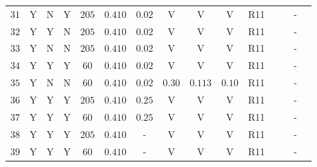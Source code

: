 \begin{center}
\begin{longtable}{@{\extracolsep{\fill}}ccccccccccccccc@{}}
\rule[-1ex]{0pt}{2.5ex} $31$ & Y & N & Y & $205$ & $0.410$ & $0.02$ & V & V & V & R11 & \cite{Humphreys:2013eja} & \cite{Pietrzynski:2013gia} & - & \cite{vanLeeuwen:2007xw} \\
\rule[-1ex]{0pt}{2.5ex} $32$ & Y & Y & N & $205$ & $0.410$ & $0.02$ & V & V & V & R11 & \cite{Humphreys:2013eja} & \cite{Pietrzynski:2013gia} & - & \cite{vanLeeuwen:2007xw} \\
\rule[-1ex]{0pt}{2.5ex} $33$ & Y & N & N & $205$ & $0.410$ & $0.02$ & V & V & V & R11 & \cite{Humphreys:2013eja} & \cite{Pietrzynski:2013gia} & - & \cite{vanLeeuwen:2007xw} \\
\rule[-1ex]{0pt}{2.5ex} $34$ & Y & Y & Y & $60$ & $0.410$ & $0.02$ & V & V & V & R11 & \cite{Humphreys:2013eja} & \cite{Pietrzynski:2013gia} & - & \cite{vanLeeuwen:2007xw} \\
\rule[-1ex]{0pt}{2.5ex} $35$ & Y & N & N & $60$ & $0.410$ & $0.02$ & $0.30$ & $0.113$ & $0.10$ & R11 & \cite{Humphreys:2013eja} & \cite{Pietrzynski:2013gia} & - & \cite{vanLeeuwen:2007xw} \\
\rule[-1ex]{0pt}{2.5ex} $36$ & Y & Y & Y & $205$ & $0.410$ & $0.25$ & V & V & V & R11 & \cite{Humphreys:2013eja} & \cite{Pietrzynski:2013gia} & - & \cite{vanLeeuwen:2007xw} \\
\rule[-1ex]{0pt}{2.5ex} $37$ & Y & Y & Y & $60$ & $0.410$ & $0.25$ & V & V & V & R11 & \cite{Humphreys:2013eja} & \cite{Pietrzynski:2013gia} & - & \cite{vanLeeuwen:2007xw} \\
\rule[-1ex]{0pt}{2.5ex} $38$ & Y & Y & Y & $205$ & $0.410$ & - & V & V & V & R11 & \cite{Humphreys:2013eja} & \cite{Pietrzynski:2013gia} & - & \cite{vanLeeuwen:2007xw} \\
\rule[-1ex]{0pt}{2.5ex} $39$ & Y & Y & Y & $60$ & $0.410$ & - & V & V & V & R11 & \cite{Humphreys:2013eja} & \cite{Pietrzynski:2013gia} & - & \cite{vanLeeuwen:2007xw} \\ 


\end{longtable}
\end{center}
